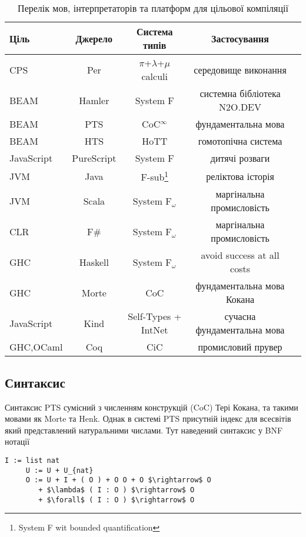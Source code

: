 \begin{table}[h]
\begin{center}
\caption{Перелік мов, інтерпретаторів та платформ для цільової компіляції}
\begin{tabular}{lcccc}
\hline
\rowcolor{ZimaBlue}
\textbf{Ціль} & \textbf{Джерело} & \textbf{Система типів} & \textbf{Застосування}\\
\hline
\rowcolor{LightGray}
CPS        & Per      & $\pi$+$\lambda$+$\mu$ calculi & середовище виконання \\
\rowcolor{LightGray}
BEAM       & Hamler     & System F            & системна бібліотека N2O.DEV \\
\rowcolor{LightGray}
BEAM       & PTS        & CoC$^\infty$        & фундаментальна мова \\
\rowcolor{LightGray}
BEAM       & HTS        & HoTT                & гомотопічна система \\
\hline
JavaScript & PureScript & System F & дитячі розваги \\
JVM        & Java       & F-sub\footnote{System F wit bounded quantification} & реліктова історія \\
JVM        & Scala      & System F$_\omega$   & маргінальна промисловість \\
CLR        & F\#        & System F$_\omega$   & маргінальна промисловість \\
GHC        & Haskell    & System F$_\omega$   & avoid success at all costs \\
GHC        & Morte      & CoC                 & фундаментальна мова Кокана \\
JavaScript & Kind       & Self-Types + IntNet & сучасна фундаментальна мова \\
GHC,OCaml  & Coq        & CiC                 & промисловий прувер \\
\hline
\end{tabular}
\end{center}
\end{table}

\subsection{Синтаксис}
Синтаксис PTS сумісний з численням конструкцій (CoC) Тері Кокана,
та такими мовами як Morte та Henk.
Однак в системі PTS присутній індекс для всесвітів який
представлений натуральними числами. Тут наведений синтаксис у BNF нотації

\begin{lstlisting}[mathescape=true]
     I := list nat
     U := U + U_{nat}
     O := U + I + ( O ) + O O + O $\rightarrow$ O
        + $\lambda$ ( I : O ) $\rightarrow$ O
        + $\forall$ ( I : O ) $\rightarrow$ O
\end{lstlisting}

